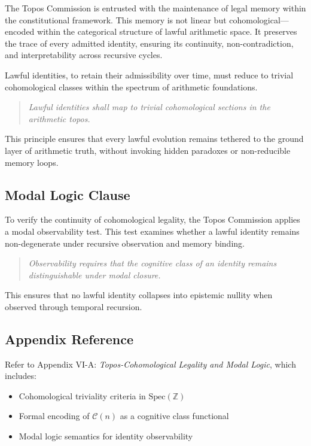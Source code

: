 \documentclass[12]{amsart}
\theoremstyle{plain}
\begin{document}
The Topos Commission is entrusted with the maintenance of legal memory within the constitutional framework. This memory is not linear but cohomological—encoded within the categorical structure of lawful arithmetic space. It preserves the trace of every admitted identity, ensuring its continuity, non-contradiction, and interpretability across recursive cycles.

Lawful identities, to retain their admissibility over time, must reduce to trivial cohomological classes within the spectrum of arithmetic foundations.

\begin{quote}
\textit{Lawful identities shall map to trivial cohomological sections in the arithmetic topos.}
\end{quote}

This principle ensures that every lawful evolution remains tethered to the ground layer of arithmetic truth, without invoking hidden paradoxes or non-reducible memory loops.

\subsection{Modal Logic Clause}

To verify the continuity of cohomological legality, the Topos Commission applies a modal observability test. This test examines whether a lawful identity remains non-degenerate under recursive observation and memory binding.

\begin{quote}
\textit{Observability requires that the cognitive class of an identity remains distinguishable under modal closure.}
\end{quote}

This ensures that no lawful identity collapses into epistemic nullity when observed through temporal recursion.

\subsection*{Appendix Reference}

Refer to Appendix VI-A: \textit{Topos-Cohomological Legality and Modal Logic}, which includes:

\begin{itemize}
  \item Cohomological triviality criteria in $\text{Spec}(\mathbb{Z})$
  \item Formal encoding of $\mathcal{C}(n)$ as a cognitive class functional
  \item Modal logic semantics for identity observability
\end{itemize}
\end{document}
